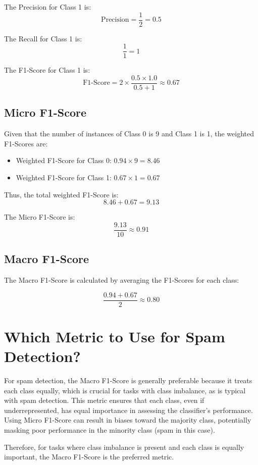 \documentclass{article}
\begin{document}
The Precision for Class 1 is:
$$ \text{Precision} = \frac{1}{2} = 0.5 $$

The Recall for Class 1 is:
$$ \frac{1}{1} = 1 $$

The F1-Score for Class 1 is:
$$ \text{F1-Score} = 2 \times \frac{0.5 \times 1.0}{0.5 + 1} \approx 0.67 $$

\subsection{Micro F1-Score}

Given that the number of instances of Class 0 is 9 and Class 1 is 1, the weighted F1-Scores are:

\begin{itemize}
    \item Weighted F1-Score for Class 0: $0.94 \times 9 = 8.46$
    \item Weighted F1-Score for Class 1: $0.67 \times 1 = 0.67$
\end{itemize}

Thus, the total weighted F1-Score is:
$$ 8.46 + 0.67 = 9.13 $$

The Micro F1-Score is:
$$ \frac{9.13}{10} \approx 0.91 $$

\subsection{Macro F1-Score}

The Macro F1-Score is calculated by averaging the F1-Scores for each class:

$$ \frac{0.94 + 0.67}{2} \approx 0.80 $$

\section{Which Metric to Use for Spam Detection?}

For spam detection, the Macro F1-Score is generally preferable because it treats each class equally, which is crucial for tasks with class imbalance, as is typical with spam detection. This metric ensures that each class, even if underrepresented, has equal importance in assessing the classifier's performance. Using Micro F1-Score can result in biases toward the majority class, potentially masking poor performance in the minority class (spam in this case). 

Therefore, for tasks where class imbalance is present and each class is equally important, the Macro F1-Score is the preferred metric.
\end{document}
